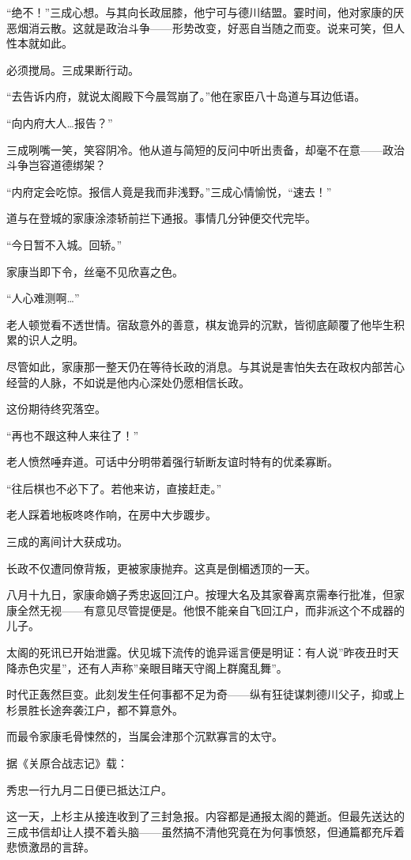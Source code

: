 \documentclass[
]{book}
\begin{document}
``绝不！''三成心想。与其向长政屈膝，他宁可与德川结盟。霎时间，他对家康的厌恶烟消云散。这就是政治斗争------形势改变，好恶自当随之而变。说来可笑，但人性本就如此。

必须搅局。三成果断行动。

``去告诉内府，就说太阁殿下今晨驾崩了。''他在家臣八十岛道与耳边低语。

``向内府大人\ldots 报告？''

三成咧嘴一笑，笑容阴冷。他从道与简短的反问中听出责备，却毫不在意------政治斗争岂容道德绑架？

``内府定会吃惊。报信人竟是我而非浅野。''三成心情愉悦，``速去！''

道与在登城的家康涂漆轿前拦下通报。事情几分钟便交代完毕。

``今日暂不入城。回轿。''

家康当即下令，丝毫不见欣喜之色。

``人心难测啊\ldots{}''

老人顿觉看不透世情。宿敌意外的善意，棋友诡异的沉默，皆彻底颠覆了他毕生积累的识人之明。

尽管如此，家康那一整天仍在等待长政的消息。与其说是害怕失去在政权内部苦心经营的人脉，不如说是他内心深处仍愿相信长政。

这份期待终究落空。

``再也不跟这种人来往了！''

老人愤然唾弃道。可话中分明带着强行斩断友谊时特有的优柔寡断。

``往后棋也不必下了。若他来访，直接赶走。''

老人踩着地板咚咚作响，在房中大步踱步。

三成的离间计大获成功。

长政不仅遭同僚背叛，更被家康抛弃。这真是倒楣透顶的一天。

八月十九日，家康命嫡子秀忠返回江户。按理大名及其家眷离京需奉行批准，但家康全然无视------有意见尽管提便是。他恨不能亲自飞回江户，而非派这个不成器的儿子。

太阁的死讯已开始泄露。伏见城下流传的诡异谣言便是明证：有人说''昨夜丑时天降赤色灾星''，还有人声称''亲眼目睹天守阁上群魔乱舞''。

时代正轰然巨变。此刻发生任何事都不足为奇------纵有狂徒谋刺德川父子，抑或上杉景胜长途奔袭江户，都不算意外。

而最令家康毛骨悚然的，当属会津那个沉默寡言的太守。

据《关原合战志记》载：

秀忠一行九月二日便已抵达江户。

这一天，上杉主从接连收到了三封急报。内容都是通报太阁的薨逝。但最先送达的三成书信却让人摸不着头脑------虽然搞不清他究竟在为何事愤怒，但通篇都充斥着悲愤激昂的言辞。
\end{document}
